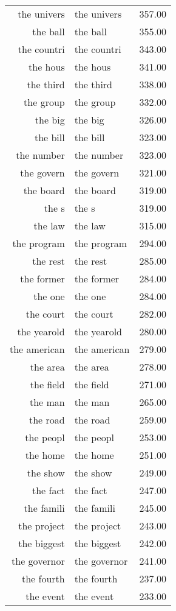 \begin{table}[ht]
\begin{tabular}{rlr}
  the univers & the univers & 357.00 \\ 
  the ball & the ball & 355.00 \\ 
  the countri & the countri & 343.00 \\ 
  the hous & the hous & 341.00 \\ 
  the third & the third & 338.00 \\ 
  the group & the group & 332.00 \\ 
  the big & the big & 326.00 \\ 
  the bill & the bill & 323.00 \\ 
  the number & the number & 323.00 \\ 
  the govern & the govern & 321.00 \\ 
  the board & the board & 319.00 \\ 
  the s & the s & 319.00 \\ 
  the law & the law & 315.00 \\ 
  the program & the program & 294.00 \\ 
  the rest & the rest & 285.00 \\ 
  the former & the former & 284.00 \\ 
  the one & the one & 284.00 \\ 
  the court & the court & 282.00 \\ 
  the yearold & the yearold & 280.00 \\ 
  the american & the american & 279.00 \\ 
  the area & the area & 278.00 \\ 
  the field & the field & 271.00 \\ 
  the man & the man & 265.00 \\ 
  the road & the road & 259.00 \\ 
  the peopl & the peopl & 253.00 \\ 
  the home & the home & 251.00 \\ 
  the show & the show & 249.00 \\ 
  the fact & the fact & 247.00 \\ 
  the famili & the famili & 245.00 \\ 
  the project & the project & 243.00 \\ 
  the biggest & the biggest & 242.00 \\ 
  the governor & the governor & 241.00 \\ 
  the fourth & the fourth & 237.00 \\ 
  the event & the event & 233.00 \\ 

\end{tabular}
\end{table}
